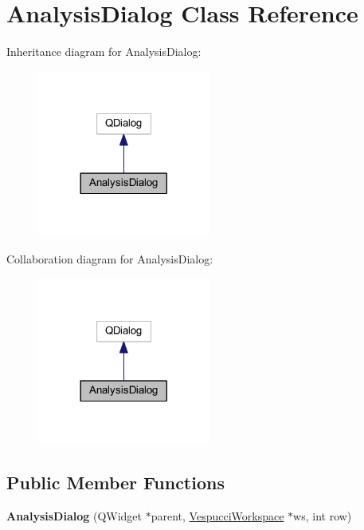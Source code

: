 \hypertarget{class_analysis_dialog}{\section{Analysis\+Dialog Class Reference}
\label{class_analysis_dialog}
}


Inheritance diagram for Analysis\+Dialog\+:\nopagebreak
\begin{figure}[H]
\begin{center}
\leavevmode
\includegraphics[width=161pt]{class_analysis_dialog__inherit__graph}
\end{center}
\end{figure}


Collaboration diagram for Analysis\+Dialog\+:\nopagebreak
\begin{figure}[H]
\begin{center}
\leavevmode
\includegraphics[width=161pt]{class_analysis_dialog__coll__graph}
\end{center}
\end{figure}
\subsection*{Public Member Functions}
\begin{DoxyCompactItemize}
\item 
\hypertarget{class_analysis_dialog_a74170aa9e6cabf4154cedf788a31f755}{{\bfseries Analysis\+Dialog} (Q\+Widget $\ast$parent, \hyperlink{class_vespucci_workspace}{Vespucci\+Workspace} $\ast$ws, int row)}\label{class_analysis_dialog_a74170aa9e6cabf4154cedf788a31f755}

\end{DoxyCompactItemize}


